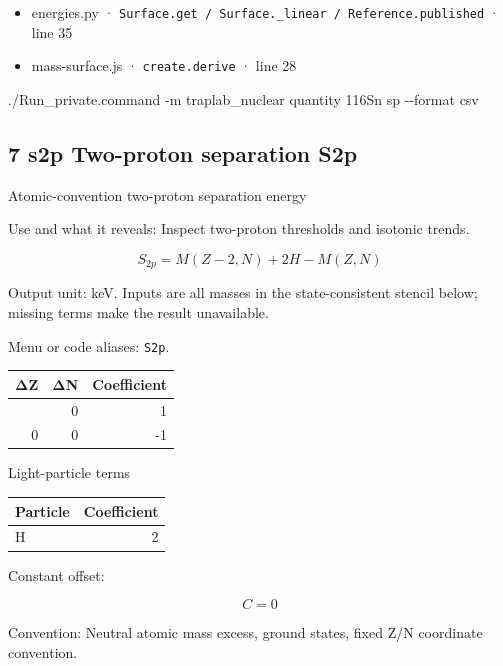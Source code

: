 \documentclass[
  11pt,
  letterpaper,
]{article}
\newenvironment{Shaded}{}{}
\newcommand{\AttributeTok}[1]{\textcolor[rgb]{0.49,0.56,0.16}{#1}}
\newcommand{\ExtensionTok}[1]{#1}
\newcommand{\NormalTok}[1]{#1}
\providecommand{\tightlist}{%
  \setlength{\itemsep}{0pt}\setlength{\parskip}{0pt}}
\begin{document}
\begin{itemize}
\tightlist
\item
  energies.py ·
  \texttt{Surface.get\ /\ Surface.\_linear\ /\ Reference.published} ·
  line 35
\item
  mass-surface.js · \texttt{create.derive} · line 28
\end{itemize}

\begin{Shaded}
\begin{Highlighting}[]
\ExtensionTok{./Run\_private.command} \AttributeTok{{-}m}\NormalTok{ traplab\_nuclear quantity 116Sn sp }\AttributeTok{{-}{-}format}\NormalTok{ csv}
\end{Highlighting}
\end{Shaded}

\subsection{7 s2p Two-proton separation
S2p}\label{s2p-two-proton-separation-s2p}

Atomic-convention two-proton separation energy

Use and what it reveals: Inspect two-proton thresholds and isotonic
trends.

\[
S_{2p}=M(Z-2,N)+2H-M(Z,N)
\]

Output unit: keV. Inputs are all masses in the state-consistent stencil
below; missing terms make the result unavailable.

Menu or code aliases: \texttt{S2p}.

\begin{longtable}[]{@{}rrr@{}}
\toprule\noalign{}
ΔZ & ΔN & Coefficient \\
\midrule\noalign{}
\endhead
\bottomrule\noalign{}
\endlastfoot
-2 & 0 & 1 \\
0 & 0 & -1 \\
\end{longtable}

Light-particle terms

\begin{longtable}[]{@{}lr@{}}
\toprule\noalign{}
Particle & Coefficient \\
\midrule\noalign{}
\endhead
\bottomrule\noalign{}
\endlastfoot
H & 2 \\
\end{longtable}

Constant offset:

\[
C=0
\]

Convention: Neutral atomic mass excess, ground states, fixed Z/N
coordinate convention.
\end{document}
